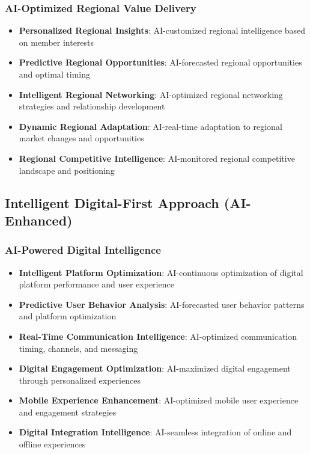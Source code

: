\subsubsection{AI-Optimized Regional Value Delivery}

\begin{itemize}
    \item \textbf{Personalized Regional Insights}: AI-customized regional intelligence based on member interests
    \item \textbf{Predictive Regional Opportunities}: AI-forecasted regional opportunities and optimal timing
    \item \textbf{Intelligent Regional Networking}: AI-optimized regional networking strategies and relationship development
    \item \textbf{Dynamic Regional Adaptation}: AI-real-time adaptation to regional market changes and opportunities
    \item \textbf{Regional Competitive Intelligence}: AI-monitored regional competitive landscape and positioning
\end{itemize}

\subsection{Intelligent Digital-First Approach (AI-Enhanced)}

\subsubsection{AI-Powered Digital Intelligence}

\begin{itemize}
    \item \textbf{Intelligent Platform Optimization}: AI-continuous optimization of digital platform performance and user experience
    \item \textbf{Predictive User Behavior Analysis}: AI-forecasted user behavior patterns and platform optimization
    \item \textbf{Real-Time Communication Intelligence}: AI-optimized communication timing, channels, and messaging
    \item \textbf{Digital Engagement Optimization}: AI-maximized digital engagement through personalized experiences
    \item \textbf{Mobile Experience Enhancement}: AI-optimized mobile user experience and engagement strategies
    \item \textbf{Digital Integration Intelligence}: AI-seamless integration of online and offline experiences
\end{itemize}


